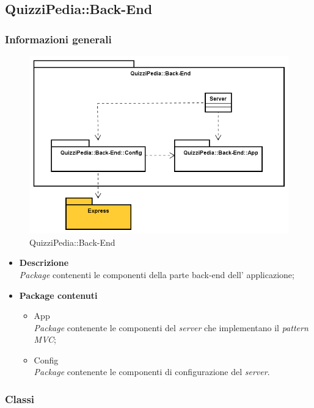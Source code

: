 \subsection{QuizziPedia::Back-End}
\subsubsection{Informazioni generali}
\label{QuizziPedia::Back-End}
\begin{figure}[ht]
	\centering
	\includegraphics[scale=0.45]{UML/Package/QuizziPedia_Back-End.png}
	\caption{QuizziPedia::Back-End}
\end{figure}
\FloatBarrier
	\begin{itemize}
		\item \textbf{Descrizione} \\ 
		\textit{Package} contenenti le componenti della parte back-end dell' applicazione;
		\item \textbf{Package contenuti}
		\begin{itemize}
			\item App \\
			\textit{Package} contenente le componenti del \textit{server} che implementano il \textit{pattern MVC};
			\item Config \\
			\textit{Package} contenente le componenti di configurazione del \textit{server}.
		\end{itemize}
	\end{itemize}
\subsubsection{Classi}
